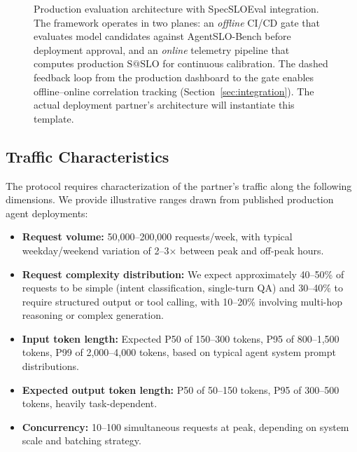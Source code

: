 \documentclass[11pt]{article}
\makeatletter
\newcommand{\sslo}{\ensuremath{\mathrm{S@SLO}}}
\makeatother
\begin{document}
\begin{figure}[t]
\caption{Production evaluation architecture with SpecSLOEval integration. The framework operates in two planes: an \emph{offline} CI/CD gate that evaluates model candidates against AgentSLO-Bench before deployment approval, and an \emph{online} telemetry pipeline that computes production $\sslo{}$ for continuous calibration. The dashed feedback loop from the production dashboard to the gate enables offline--online correlation tracking (Section~\ref{sec:integration}). The actual deployment partner's architecture will instantiate this template.}
\label{fig:system-arch}
\end{figure}

\subsection{Traffic Characteristics}

The protocol requires characterization of the partner's traffic along the following dimensions. We provide illustrative ranges drawn from published production agent deployments:

\begin{itemize}[leftmargin=16pt]
    \item \textbf{Request volume:} 50,000--200,000 requests/week, with typical weekday/weekend variation of 2--3$\times$ between peak and off-peak hours.
    \item \textbf{Request complexity distribution:} We expect approximately 40--50\% of requests to be simple (intent classification, single-turn QA) and 30--40\% to require structured output or tool calling, with 10--20\% involving multi-hop reasoning or complex generation.
    \item \textbf{Input token length:} Expected P50 of 150--300 tokens, P95 of 800--1,500 tokens, P99 of 2,000--4,000 tokens, based on typical agent system prompt distributions.
    \item \textbf{Expected output token length:} P50 of 50--150 tokens, P95 of 300--500 tokens, heavily task-dependent.
    \item \textbf{Concurrency:} 10--100 simultaneous requests at peak, depending on system scale and batching strategy.
\end{itemize}
\end{document}
